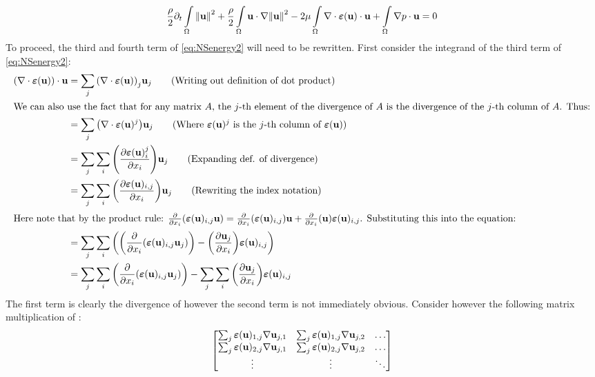  \begin{equation}\label{eq:NSenergy2}
  \frac{\rho}{2}\partial_{t}\int\limits_{\Omega}\norm{{\textbf{u}}}^2 + \frac{\rho}{2}\int\limits_{\Omega}{\textbf{u}}\cdot\nabla\norm{{\textbf{u}}}^2 - 2\mu\int\limits_{\Omega}\nabla\cdot\bm{\varepsilon}({\textbf{u}}) \cdot {\textbf{u}} + \int\limits_{\Omega}\nabla p \cdot {\textbf{u}} = 0
 \end{equation}
 To proceed, the third and fourth term of \eqref{eq:NSenergy2} will need to be rewritten. First consider the integrand of the third term of \eqref{eq:NSenergy2}:
 \begin{align*}
     \qty(\nabla\cdot\stresstens)\cdot\bmu &= \sum_j \qty(\nabla\cdot\stresstens)_{j}\bmu_{j} \tag*{(Writing out definition of dot product)}\\
        \intertext{We can also use the fact that for any matrix \mathm{A}, the \mathm{j}-th element of the divergence of \mathm{A} is the divergence of the \mathm{j}-th column of \mathm{A}. Thus:}
        &= \sum_j \qty(\nabla\cdot\stresstens^{j})\bmu_{j} \tag*{(Where \mathm{\stresstens^j} is the \mathm{j}-th column of \mathm{\stresstens})}\\
        &= \sum_j \sum_i \qty(\pdv{\stresstens^j_i}{x_i})\bmu_j \tag*{(Expanding def. of divergence)}\\
        &= \sum_j \sum_i \qty(\pdv{\stresstens_{i,j}}{x_i})\bmu_j \tag*{(Rewriting the index notation)}\\
        \intertext{Here note that by the product rule: \mathm{\pdv{}{x_i}\qty(\stresstens_{i,j}\bmu) = \pdv{}{x_i}\qty(\stresstens_{i,j})\bmu + \pdv{}{x_i}\qty(\bmu)\stresstens_{i,j}}. Substituting this into the equation:}
        &= \sum_j \sum_i \qty(\qty(\pdv{}{x_i}\qty(\stresstens_{i,j}\bmu_j)) - \qty(\pdv{\bmu_j}{x_i})\stresstens_{i,j})\\
        &= \sum_j \sum_i \qty(\pdv{}{x_i}\qty(\stresstens_{i,j}\bmu_j)) - \sum_j \sum_i \qty(\pdv{\bmu_j}{x_i})\stresstens_{i,j} \\
\end{align*}
The first term is clearly the divergence of \mathm{\stresstens\bmu} however the second term is not immediately obvious. Consider however the following matrix multiplication of \mathm{\stresstens\nabla\bmu}:\\
\[
\begin{bmatrix}
\sum_{j}\bm{\varepsilon}({\textbf{u}})_{1,j}\nabla{\textbf{u}}_{j,1} & \sum_{j}\bm{\varepsilon}({\textbf{u}})_{1,j}\nabla{\textbf{u}}_{j,2} & \hdots \\
\sum_{j}\bm{\varepsilon}({\textbf{u}})_{2,j}\nabla{\textbf{u}}_{j,1} & \sum_{j}\bm{\varepsilon}({\textbf{u}})_{2,j}\nabla{\textbf{u}}_{j,2} & \hdots \\
\vdots  & \vdots  & \ddots
\end{bmatrix}
\]

